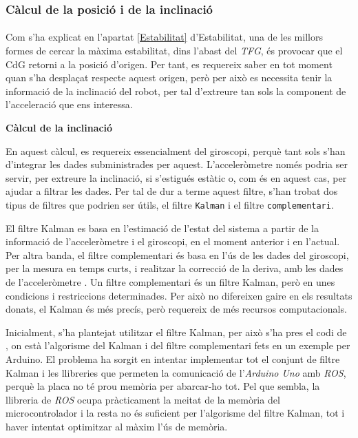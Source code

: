 \documentclass[12pt,a4paper,final,twoside]{article}
\begin{document}
\subsubsection{Càlcul de la posició i de la inclinació}
\label{Calcul-posicio-inclinacio}

\paragraph{}Com s'ha explicat en l'apartat \ref{Estabilitat} d'Estabilitat, una de les millors formes de cercar la màxima estabilitat, dins l'abast del \textit{TFG}, és provocar que el CdG retorni a la posició d'origen. Per tant, es requereix saber en tot moment quan s'ha desplaçat respecte aquest origen, però per això es necessita tenir la informació de la inclinació del robot, per tal d'extreure tan sols la component de l'acceleració que ens interessa.


\vspace{20pt}
\textbf{Càlcul de la inclinació}

En aquest càlcul, es requereix essencialment del giroscopi, perquè tant sols s'han d'integrar les dades subministrades per aquest. L'acceleròmetre només podria ser servir, per extreure la inclinació, si s'estigués estàtic o, com és en aquest cas, per ajudar a filtrar les dades. Per tal de dur a terme aquest filtre, s'han trobat dos tipus de filtres que podrien ser útils, el filtre \texttt{Kalman} i el filtre \texttt{complementari}.

El filtre Kalman es basa en l'estimació de l'estat del sistema a partir de la informació de l'acceleròmetre i el giroscopi, en el moment anterior i en l'actual. Per altra banda, el filtre complementari és basa en l'ús de les dades del giroscopi, per la mesura en temps curts, i realitzar la correcció de la deriva, amb les dades de l'acceleròmetre \cite{Gaydou2011}. Un filtre complementari és un filtre Kalman, però en unes condicions i restriccions determinades. Per això no difereixen gaire en els resultats donats, el Kalman és més precís, però requereix de més recursos computacionals.

Inicialment, s'ha plantejat utilitzar el filtre Kalman, per això s'ha pres el codi de \cite{Lauszus2012}, on està l'algorisme del Kalman i del filtre complementari fets en un exemple per Arduino. El problema ha sorgit en intentar implementar tot el conjunt de filtre Kalman i les llibreries que permeten la comunicació de l'\textit{Arduino Uno} amb \textit{ROS}, perquè la placa no té prou memòria per abarcar-ho tot. Pel que sembla, la llibreria de \textit{ROS} ocupa pràcticament la meitat de la memòria del microcontrolador i la resta no és suficient per l'algorisme del filtre Kalman, tot i haver intentat optimitzar al màxim l'ús de memòria.
\end{document}
